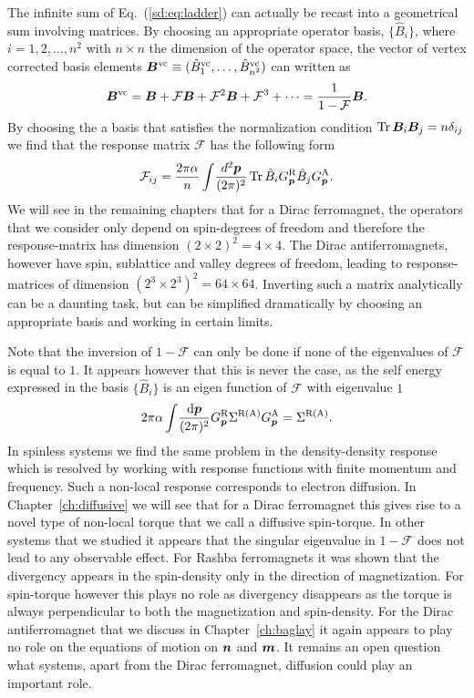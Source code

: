 The infinite sum of Eq.~(\ref{sd:eq:ladder}) can actually be recast into a geometrical sum involving matrices. By choosing an appropriate operator basis, $\{\hat{B}_i\}$, where $i=1,2,\dots,n^2$ with $n\times n$ the dimension of the operator space, the vector of vertex corrected basis elements $\boldsymbol{B}^\text{vc}\equiv(\hat{B}_1^\text{vc},\dots,\hat{B}_{{n^2}}^\text{vc})$ can written as
\begin{equation}
	\boldsymbol{B}^\text{vc} = \boldsymbol{B}+\mathcal{F}\boldsymbol{B}+\mathcal{F}^2\boldsymbol{B}+\mathcal{F}^3+\cdots = \frac{1}{1-\mathcal{F}}\boldsymbol{B}.
\end{equation}
By choosing the a basis that satisfies the normalization condition $\operatorname{Tr}\boldsymbol{B}_i\boldsymbol{B}_j=n\delta_{ij}$ we find that the response matrix $\mathcal{F}$ has the following form
\begin{equation}
	\mathcal{F}_{ij} = \frac{2\pi\alpha}{n} \int\!\frac{d^2\boldsymbol{p}}{(2\pi)^2}\operatorname{Tr} \hat{B}_i G^\text{R}_{\boldsymbol{p}} \hat{B}_j G^\text{A}_{\boldsymbol{p}}.
\end{equation}
We will see in the remaining chapters that for a Dirac ferromagnet, the operators that we consider only depend on spin-degrees of freedom and therefore the response-matrix has dimension $(2\times2)^2=4\times4$. The Dirac antiferromagnets, however have spin, sublattice and valley degrees of freedom, leading to response-matrices of dimension $(2^3\times2^3)^2=64\times64$. Inverting such a matrix analytically can be a daunting task, but can be simplified dramatically by choosing an appropriate basis and working in certain limits. 

Note that the inversion of $1-\mathcal{F}$ can only be done if none of the eigenvalues of $\mathcal{F}$ is equal to $1$. It appears however that this is never the case, as the self energy expressed in the basis $\{\hat{B}_i\}$ is an eigen function of $\mathcal{F}$ with eigenvalue $1$
\begin{equation}
	2\pi\alpha\int\!\frac{\mathrm{d}\boldsymbol{p}}{(2\pi)^2} G^\text{R}_{\boldsymbol{p}}\Sigma^\text{R(A)}G^\text{A}_{\boldsymbol{p}} = \Sigma^\text{R(A)}.
\end{equation}
In spinless systems we find the same problem in the density-density response which is resolved by working with response functions with finite momentum and frequency. Such a non-local response corresponds to electron diffusion. In Chapter~\ref{ch:diffusive} we will see that for a Dirac ferromagnet this gives rise to a novel type of non-local torque that we call a diffusive spin-torque. In other systems that we studied it appears that the singular eigenvalue in $1-\mathcal{F}$ does not lead to any observable effect. For Rashba ferromagnets it was shown that the divergency appears in the spin-density only in the direction of magnetization. For spin-torque however this plays no role as divergency disappears as the torque is always perpendicular to both the magnetization and spin-density. For the Dirac antiferromagnet that we discuss in Chapter~\ref{ch:baglay} it again appears to play no role on the equations of motion on $\boldsymbol{n}$ and $\boldsymbol{m}$. It remains an open question what systems, apart from the Dirac ferromagnet, diffusion could play an important role. 
